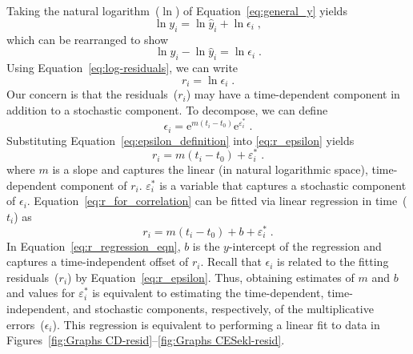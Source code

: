 \documentclass[preprint,authoryear,12pt]{elsarticle}\usepackage[]{graphicx}\usepackage[]{color}
\begin{document}
Taking the natural logarithm~($\ln$) of Equation~\ref{eq:general_y} yields
%
\begin{equation} \label{eq:ln_y}
  \ln y_i = \ln \hat{y}_i + \ln \epsilon_i \; ,
\end{equation}
%
which can be rearranged to show
%
\begin{equation} \label{eq:lny_prep_for_r}
  \ln y_i - \ln \hat{y}_i = \ln \epsilon_i \; .
\end{equation}
%
Using Equation~\ref{eq:log-residuals}, we can write
%
\begin{equation} \label{eq:r_epsilon}
  r_i = \ln \epsilon_i \; .
\end{equation}
%
Our concern is that the residuals~($r_i$) may have a time-dependent component 
in addition to a stochastic component.
To decompose, we can define
%
\begin{equation} \label{eq:epsilon_definition}
  \epsilon_i = \mathrm{e}^{m(t_i - t_0)} \mathrm{e}^{\varepsilon_i^*} \; .
\end{equation}
%
Substituting Equation~\ref{eq:epsilon_definition} into \ref{eq:r_epsilon} yields
%
\begin{equation} \label{eq:r_for_correlation}
  r_i = m (t_i - t_0) + \varepsilon_i^* \; .
\end{equation}
%
where
$m$ is a slope and captures the linear (in natural logarithmic space), 
time-dependent component of $r_i$. 
$\varepsilon_i^*$ is a variable that captures a stochastic component of $\epsilon_i$.
Equation~\ref{eq:r_for_correlation} can be fitted via linear regression in time~($t_i$) as
%
\begin{equation} \label{eq:r_regression_eqn}
  r_i = m (t_i - t_0) + b + \varepsilon_i^* \; .
\end{equation}
%
In Equation~\ref{eq:r_regression_eqn},
$b$ is the $y$-intercept of the regression and captures a time-independent offset of $r_i$.
Recall that $\epsilon_i$ is related to the fitting residuals~($r_i$)
by Equation~\ref{eq:r_epsilon}.
Thus, obtaining estimates of $m$ and $b$ and values for $\varepsilon_i^*$
is equivalent to estimating the time-dependent, time-independent, and stochastic
components, respectively, of the multiplicative errors~($\epsilon_i$).
This regression is equivalent to performing a linear fit to data in 
Figures~\ref{fig:Graphs CD-resid}--\ref{fig:Graphs CESekl-resid}.
\end{document}
